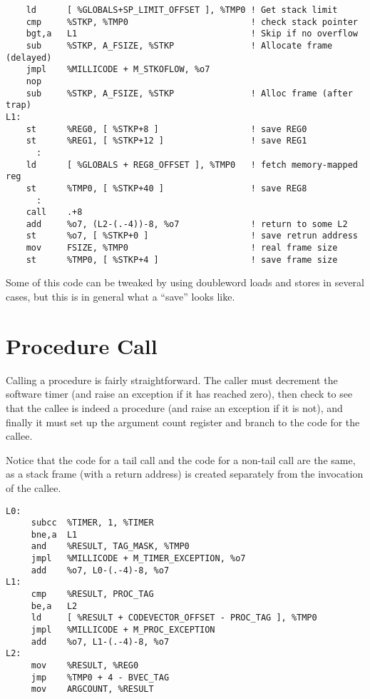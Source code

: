 \begin{minipage}{\linewidth}
\begin{verbatim}
    ld      [ %GLOBALS+SP_LIMIT_OFFSET ], %TMP0 ! Get stack limit
    cmp     %STKP, %TMP0                        ! check stack pointer
    bgt,a   L1                                  ! Skip if no overflow
    sub     %STKP, A_FSIZE, %STKP               ! Allocate frame (delayed)
    jmpl    %MILLICODE + M_STKOFLOW, %o7
    nop
    sub     %STKP, A_FSIZE, %STKP               ! Alloc frame (after trap)
L1:
    st      %REG0, [ %STKP+8 ]                  ! save REG0
    st      %REG1, [ %STKP+12 ]                 ! save REG1
      :
    ld      [ %GLOBALS + REG8_OFFSET ], %TMP0   ! fetch memory-mapped reg
    st      %TMP0, [ %STKP+40 ]                 ! save REG8
      :
    call    .+8
    add     %o7, (L2-(.-4))-8, %o7              ! return to some L2
    st      %o7, [ %STKP+0 ]                    ! save retrun address
    mov     FSIZE, %TMP0                        ! real frame size
    st      %TMP0, [ %STKP+4 ]                  ! save frame size
\end{verbatim}
\end{minipage}

Some of this code can be tweaked by using doubleword loads and stores in
several cases, but this is in general what a ``save'' looks like.

\section{Procedure Call}

Calling a procedure is fairly straightforward. The caller must decrement
the software timer (and raise an exception if it has reached zero), then check
to see that the callee is indeed a procedure (and raise an exception if it
is not), and finally it must set up the argument count register and branch
to the code for the callee.

Notice that the code for a tail call and the code for a non-tail call are
the same, as a stack frame (with a return address) is created separately
from the invocation of the callee.

\begin{minipage}{\linewidth}
\begin{verbatim}
L0:
     subcc  %TIMER, 1, %TIMER
     bne,a  L1
     and    %RESULT, TAG_MASK, %TMP0
     jmpl   %MILLICODE + M_TIMER_EXCEPTION, %o7
     add    %o7, L0-(.-4)-8, %o7
L1:
     cmp    %RESULT, PROC_TAG
     be,a   L2
     ld     [ %RESULT + CODEVECTOR_OFFSET - PROC_TAG ], %TMP0
     jmpl   %MILLICODE + M_PROC_EXCEPTION
     add    %o7, L1-(.-4)-8, %o7
L2:
     mov    %RESULT, %REG0
     jmp    %TMP0 + 4 - BVEC_TAG
     mov    ARGCOUNT, %RESULT
\end{verbatim}
\end{minipage}


